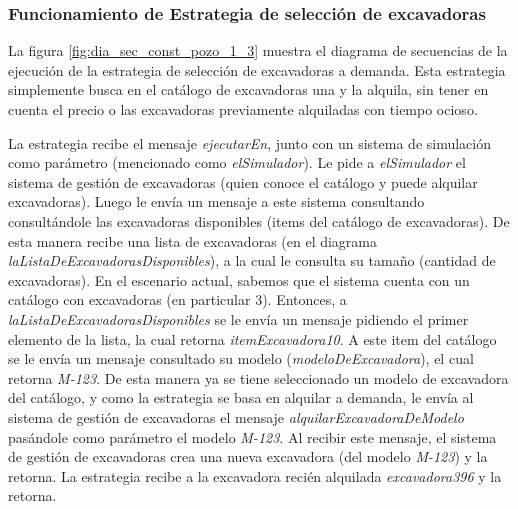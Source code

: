 \subsubsection{Funcionamiento de Estrategia de selección de excavadoras}
\label{sec:dia_sec_estr_selec_exc}
\par La figura \ref{fig:dia_sec_const_pozo_1_3} muestra el diagrama de secuencias de la ejecución de la estrategia de selección de excavadoras a demanda. Esta estrategia simplemente busca en el catálogo de excavadoras una y la alquila, sin tener en cuenta el precio o las excavadoras previamente alquiladas con tiempo ocioso.
\par La estrategia recibe el mensaje \textit{ejecutarEn}, junto con un sistema de simulación como parámetro (mencionado como \textit{elSimulador}). Le pide a \textit{elSimulador} el sistema de gestión de excavadoras (quien conoce el catálogo y puede alquilar excavadoras). Luego le envía un mensaje a este sistema consultando consultándole las excavadoras disponibles (items del catálogo de excavadoras). De esta manera recibe una lista de excavadoras (en el diagrama \textit{laListaDeExcavadorasDisponibles}), a la cual le consulta su tamaño (cantidad de excavadoras). En el escenario actual, sabemos que el sistema cuenta con un catálogo con excavadoras (en particular 3). Entonces, a \textit{laListaDeExcavadorasDisponibles} se le envía un mensaje pidiendo el primer elemento de la lista, la cual retorna \textit{itemExcavadora10}. A este item del catálogo se le envía un mensaje consultado su modelo (\textit{modeloDeExcavadora}), el cual retorna \textit{M-123}. De esta manera ya se tiene seleccionado un modelo de excavadora del catálogo, y como la estrategia se basa en alquilar a demanda, le envía al sistema de gestión de excavadoras el mensaje \textit{alquilarExcavadoraDeModelo} pasándole como parámetro el modelo \textit{M-123}. Al recibir este mensaje, el sistema de gestión de excavadoras crea una nueva excavadora (del modelo \textit{M-123}) y la retorna. La estrategia recibe a la excavadora recién alquilada \textit{excavadora396} y la retorna.

